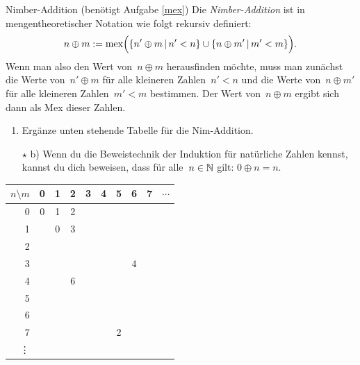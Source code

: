 \documentclass{zirkelblatt}
\begin{document}
\begin{aufgabe}{Nimber-Addition (benötigt Aufgabe \ref{mex})}
\label{nimber-addition}
Die \emph{Nimber-Addition} ist in mengentheoretischer Notation wie folgt rekursiv definiert:
\[ n \oplus m := \operatorname{mex}\Bigl(\left\{n' \oplus m \,|\, n' < n\right\} \cup
\left\{n \oplus m' \,|\, m' < m\right\}\Bigr). \]
Wenn man also den Wert von~$n \oplus m$ herausfinden möchte, muss man zunächst
die Werte von~$n' \oplus m$ für alle kleineren Zahlen~$n' < n$ und die Werte
von~$n \oplus m'$ für alle kleineren Zahlen~$m' < m$ bestimmen. Der Wert
von~$n \oplus m$ ergibt sich dann als Mex dieser Zahlen.
\begin{enumerate}
\item Ergänze unten stehende Tabelle für die Nim-Addition.
\item[$\star$ b)] Wenn du die Beweistechnik der Induktion für natürliche Zahlen kennst, kannst
du dich beweisen, dass für alle~$n \in \mathbb{N}$ gilt: $0 \oplus n = n$.
\end{enumerate}
\begin{center}
  \begin{tabular}{r|ccccccccl}
    $n \setminus m$ & 0 & 1 & 2 & 3 & 4 & 5 & 6 & 7 & $\cdots$ \\\hline
    0 & 0 & 1 & 2 \\
    1 &   & 0 & 3 \\
    2 & \\
    3 & & & & & & & 4 \\
    4 & & & 6 \\
    5 & \\
    6 & \\
    7 & & & & & & 2 \\
    \vdots
  \end{tabular}
\end{center}
\end{aufgabe}
\end{document}
